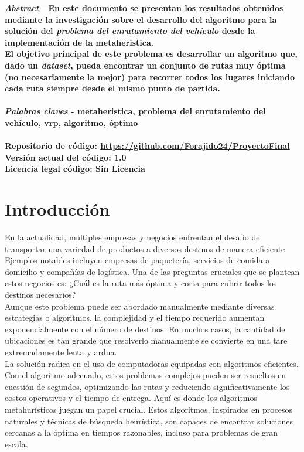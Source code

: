 \documentclass[10pt,twocolumn,letterpaper]{article}
\newcommand{\repositorio}{\url{https://github.com/Forajido24/ProyectoFinal}}
\newcommand{\version}{1.0}
\newcommand{\licencia}{Sin Licencia}
\begin{document}
\noindent\textbf{\textit{Abstract}—En este documento se presentan los resultados obtenidos mediante la investigación sobre el desarrollo del algoritmo para la solución del \textit{problema del enrutamiento del vehículo} desde la implementación de la metaheristica.
	\\
	El objetivo principal de este problema es desarrollar un algoritmo que, dado un \textit{dataset}, pueda encontrar un conjunto de rutas muy óptima  (no necesariamente la mejor) para recorrer todos los lugares iniciando cada  ruta siempre desde el mismo punto de partida.\\
	\\
	\textit{Palabras claves} - metaheristica, problema del enrutamiento del  vehículo, vrp, algoritmo, óptimo\\
	\\
	Repositorio de código: \repositorio\\
	Versión actual del código: \version\\
	Licencia legal código: \licencia
}

\section{Introducción}
En la actualidad, múltiples empresas y negocios enfrentan el desafío de transportar una variedad de productos a diversos destinos de manera eficiente Ejemplos notables incluyen empresas de paquetería, servicios de comida a domicilio y compañías de logística. Una de las preguntas cruciales que se plantean estos negocios es: ¿Cuál es la ruta más óptima y corta para cubrir todos los destinos necesarios?\\

Aunque este problema puede ser abordado manualmente mediante diversas estrategias o algoritmos, la complejidad y el tiempo requerido aumentan exponencialmente con el número de destinos. En muchos casos, la cantidad de ubicaciones es tan grande que resolverlo manualmente se convierte en una tare extremadamente lenta y ardua.\\

La solución radica en el uso de computadoras equipadas con algoritmos eficientes. Con el algoritmo adecuado, estos problemas complejos pueden ser resueltos en cuestión de segundos, optimizando las rutas y reduciendo significativamente los costos operativos y el tiempo de entrega. Aquí es donde los algoritmos metahurísticos juegan un papel crucial. Estos algoritmos, inspirados en procesos naturales y técnicas de búsqueda heurística, son capaces de encontrar soluciones cercanas a la óptima en tiempos razonables, incluso para problemas de gran escala.\\
\end{document}
